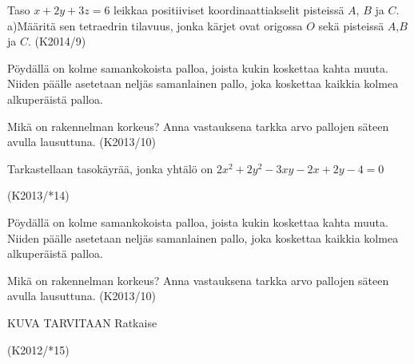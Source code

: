 \begin{tehtava}
Taso $x+2y+3z=6$ leikkaa positiiviset koordinaattiakselit pisteissä $A$, $B$ ja $C$.
a)Määritä sen tetraedrin tilavuus, jonka kärjet ovat origossa $O$ sekä pisteissä $A$,$B$ ja $C$. (K2014/9)
\end{tehtava}


\begin{tehtava}
Pöydällä on kolme samankokoista palloa, joista kukin koskettaa kahta muuta. Niiden päälle asetetaan neljäs samanlainen  pallo, joka koskettaa kaikkia kolmea alkuperäistä palloa.

Mikä on rakennelman korkeus? Anna vastauksena tarkka arvo pallojen säteen avulla lausuttuna. (K2013/10)
\end{tehtava}


\begin{tehtava}
Tarkastellaan tasokäyrää, jonka yhtälö on $2x^2+2y^2-3xy-2x+2y-4=0$
\begin{alakohdat}
	\end{alakohdat}
 (K2013/*14)
\end{tehtava}


\begin{tehtava}
Pöydällä on kolme samankokoista palloa, joista kukin koskettaa kahta muuta. Niiden päälle asetetaan neljäs samanlainen  pallo, joka koskettaa kaikkia kolmea alkuperäistä palloa.

Mikä on rakennelman korkeus? Anna vastauksena tarkka arvo pallojen säteen avulla lausuttuna. (K2013/10)
\end{tehtava}

\begin{tehtava} KUVA TARVITAAN Ratkaise 
\begin{alakohdat}
	\end{alakohdat}
	(K2012/*15)
\end{tehtava}

